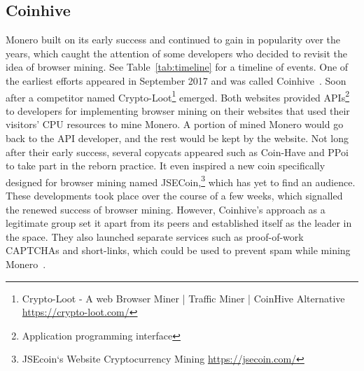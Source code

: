 \subsection{Coinhive}



Monero built on its early success and continued to gain in popularity over the years, which caught the attention of some developers who decided to revisit the idea of browser mining. See Table~\ref{tab:timeline} for a timeline of events.  One of the earliest efforts appeared in September 2017 and was called Coinhive~\cite{coinhive}. Soon after a competitor named Crypto-Loot\footnote{Crypto-Loot - A web Browser Miner | Traffic Miner | CoinHive Alternative \url{https://crypto-loot.com/}} emerged. Both websites provided APIs\footnote{Application programming interface} to developers for implementing browser mining on their websites that used their visitors' CPU resources to mine Monero. A portion of mined Monero would go back to the API developer, and the rest would be kept by the website. Not long after their early success, several copycats appeared such as Coin-Have and PPoi~\cite{coinhivecopycats} to take part in the reborn practice. It even inspired a new coin specifically designed for browser mining named JSECoin,\footnote{JSEcoin`s Website Cryptocurrency Mining \url{https://jsecoin.com/}} which has yet to find an audience. These developments took place over the course of a few weeks, which signalled the renewed success of browser mining. However, Coinhive's approach as a legitimate group set it apart from its peers and established itself as the leader in the space. They also launched separate services such as proof-of-work CAPTCHAs and short-links, which could be used to prevent spam while mining Monero~\cite{coinhive}.

%
%
%
%
%
%
